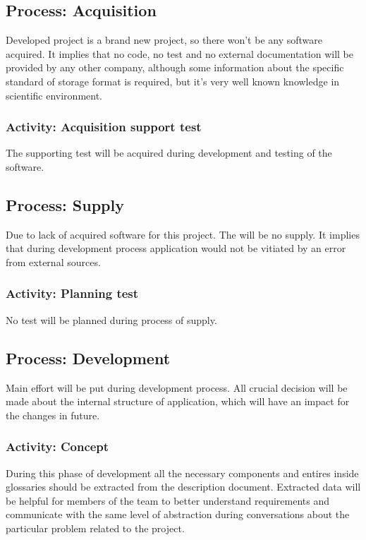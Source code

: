 	\subsection{Process: Acquisition} \label{s:details-of-the-master-test-plan:process-acquisiton}
		Developed project is a brand new project, so there won't be any software acquired. It implies that no code, no test and no external documentation will be provided by any other company, although some information about the specific standard of storage format is required, but it's very well known knowledge in scientific environment.
		\subsubsection{Activity: Acquisition support test} \label{s:details-of-the-master-test-plan:activitiy-acquisition-support-test} 
		The supporting test will be acquired during development and testing of the software.
	\subsection{Process: Supply} \label{s:details-of-the-master-test-plan:process-supply}
		Due to lack of acquired software for this project. The will be no supply. It implies that during development process application would not be vitiated by an error from external sources.
		\subsubsection{Activity: Planning test} \label{s:details-of-the-master-test-plan:activity-planning-tests}
		No test will be planned during process of supply.
	\subsection{Process: Development} \label{s:details-of-the-master-test-plan:process-development}
		Main effort will be put during development process. All crucial decision will be made about the internal structure of application, which will have an impact for the changes in future.
		\subsubsection{Activity: Concept} \label{s:details-of-the-master-test-plan:activity-concept}
		During this phase of development all the necessary components and entires inside glossaries should be extracted from the description document. Extracted data will be helpful for members of the team to better understand requirements and communicate with the same level of abstraction during conversations about the particular problem related to the project.
